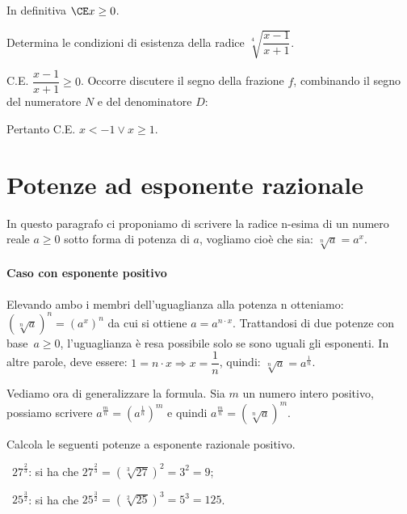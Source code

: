 \begin{exrig}
\begin{esempio}
In definitiva $\CE x\ge 0$.
\end{esempio}

\begin{esempio}
 Determina le condizioni di esistenza della radice $\sqrt[4]{\dfrac{x-1}{x+1}}$.

C.E. $\dfrac{x-1}{x+1}\ge 0$. Occorre discutere il segno della frazione $f$, combinando il segno del numeratore $N$ e del denominatore $D$:
\begin{center}
 
\end{center}
Pertanto C.E. $x<-1\vee x\ge 1$.
\end{esempio}
\end{exrig}

\vspazio\ovalbox{\risolvii \ref{ese:2.11}, \ref{ese:2.12}, \ref{ese:2.13}, \ref{ese:2.14},\ref{ese:2.15}}

\section{Potenze ad esponente razionale}
In questo paragrafo ci proponiamo di scrivere la radice n-esima di un numero reale $a\geq0$ sotto forma di potenza di $a$, vogliamo cioè che sia:
$\sqrt[n]a=a^x$.

\paragraph {Caso con esponente positivo}
Elevando ambo i membri dell’uguaglianza alla potenza n otteniamo: $\left(\sqrt[n]a\right)^n=\left(a^x\right)^n$ da cui si ottiene $a=a^{n\cdot x}$.
Trattandosi di due potenze con base~$a{\geq}0$, l'uguaglianza è resa possibile solo se sono uguali gli esponenti. In altre parole, deve essere: $1=n\cdot x \Rightarrow x=\dfrac 1 n$, quindi: $\sqrt[n]a=a^{\frac 1 n}$.

Vediamo ora di generalizzare la formula. Sia $m$ un numero intero positivo, possiamo scrivere $a^{\frac m n}=\left(a^{\frac 1 n}\right)^m$ e quindi $a^{\frac m n}=\left(\sqrt[n]a\right)^m$.
\begin{exrig}
\begin{esempio}
 Calcola le seguenti potenze a esponente razionale positivo.
 \begin{itemize*}
 \item~$27^{\frac 2 3}$: si ha che $27^{\frac 2 3}=\left(\sqrt[3]{27}\right)^2=3^2=9$;
 \item~$25^{\frac 3 2}$: si ha che $25^{\frac 3 2}=\left(\sqrt[2]{25}\right)^3=5^3=125$.
\end{itemize*}
\end{esempio}
\end{exrig}

